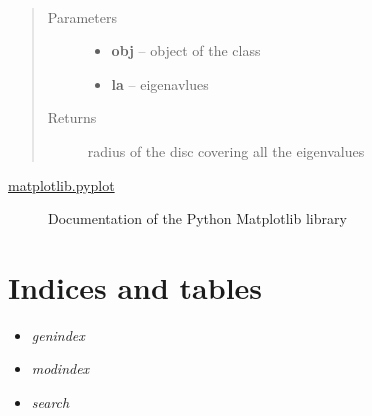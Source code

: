 \documentclass[letterpaper,10pt,english]{sphinxmanual}
\begin{document}
\begin{fulllineitems}
\label{index:brake.analyze.visual.plot_eigs_transition}~\begin{quote}\begin{description}
\item[{Parameters}] \leavevmode\begin{itemize}
\item {} 
\textbf{obj} -- object of the class 

\item {} 
\textbf{la} -- eigenavlues

\end{itemize}

\item[{Returns}] \leavevmode
radius of the disc covering all the eigenvalues

\end{description}\end{quote}

\end{fulllineitems}




\begin{description}
\item[{\href{http://matplotlib.org/api/pyplot\_api.html}{matplotlib.pyplot}}] \leavevmode
Documentation of the Python Matplotlib library

\end{description}




\chapter{Indices and tables}
\label{index:indices-and-tables}\begin{itemize}
\item {} 
\emph{genindex}

\item {} 
\emph{modindex}

\item {} 
\emph{search}

\end{itemize}
\end{document}
